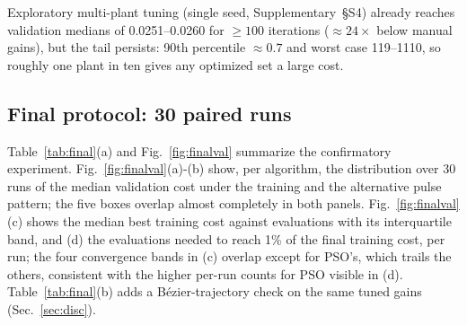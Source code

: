 \documentclass[10pt,journal,compsoc]{IEEEtran}
\begin{document}
Exploratory multi-plant tuning (single seed, Supplementary~\S S4) already reaches validation medians of 0.0251--0.0260 for $\ge100$ iterations ($\approx24\times$ below manual gains), but the tail persists: 90th percentile $\approx0.7$ and worst case 119--1110, so roughly one plant in ten gives any optimized set a large cost.

\subsection{Final protocol: 30 paired runs}\label{sec:final}
Table~\ref{tab:final}(a) and Fig.~\ref{fig:finalval} summarize the confirmatory experiment. Fig.~\ref{fig:finalval}(a)-(b) show, per algorithm, the distribution over 30 runs of the median validation cost under the training and the alternative pulse pattern; the five boxes overlap almost completely in both panels. Fig.~\ref{fig:finalval}(c) shows the median best training cost against evaluations with its interquartile band, and (d) the evaluations needed to reach 1\% of the final training cost, per run; the four convergence bands in (c) overlap except for PSO's, which trails the others, consistent with the higher per-run counts for PSO visible in (d). Table~\ref{tab:final}(b) adds a B\'ezier-trajectory check on the same tuned gains (Sec.~\ref{sec:disc}).
\end{document}

